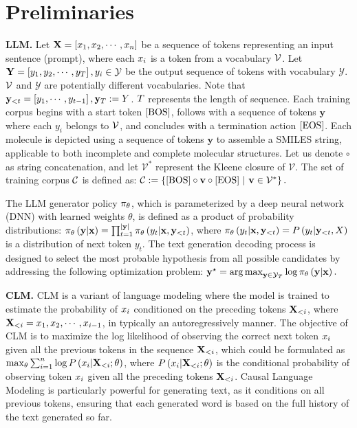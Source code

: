 \section{Preliminaries}
\textbf{LLM.} Let $\mathbf{X}=\left[{x}_1, {x}_2, \cdots, {x}_n\right]$ be a sequence of tokens representing an input sentence (prompt), where each ${x}_i$ is a token from a vocabulary $\mathcal{V}$. Let $\mathbf{Y}=\left[y_1,y_2,\cdots, y_T\right], y_i\in \mathcal{Y}$ be the output sequence of tokens with vocabulary $\mathcal{Y}$.  $\mathcal{V}$ and $\mathcal{Y}$ are potentially different vocabularies. Note that $\mathbf{y}_{<t} = \left[y_1, \cdots, y_{t-1}\right], \mathbf{y}_{T}:=Y$.
$T$ represents the length of sequence. 
Each training corpus begins with a start token $\left[\text{BOS}\right]$, follows with a sequence of tokens $\mathbf{y}$ where each $y_i$ belongs to $\mathcal{V}$, and concludes with a termination action $\left[\text{EOS}\right]$.
Each molecule is depicted using a sequence of tokens $\mathbf{y}$ to assemble a SMILES string, applicable to both incomplete and complete molecular structures.
Let us denote $\circ$ as string concatenation, and let $\mathcal{V}^*$ represent the Kleene closure of $\mathcal{V}$.
The set of training corpus $\mathcal{C}$ is defined as: 
    $\mathcal{C} := \left\{\text{[BOS]} \circ \mathbf{v} \circ \text{[EOS]}~|~\mathbf{v}\in \mathcal{V}^*\right\}.$

The LLM generator policy $\pi_{\theta}$, which is parameterized by a deep neural network (DNN) with learned weights $\theta$, is defined as a product of probability distributions:
$\pi_{\theta} \left( {\mathbf{y}|\mathbf{x}} \right) =\prod_{t=1}^{|\mathbf{y}|} \pi_{\theta} \left( {y_t|\mathbf{x},\mathbf{y}_{<t}} \right) $, where  $\pi_{\theta} \left( {y_t|\mathbf{x},\mathbf{y}_{<t}} \right) =P \left( {y_{t}|\mathbf{y}_{<t},X} \right) $ is a distribution of next token $y_t$.
The text generation decoding process is designed to select the most probable hypothesis from all possible candidates by addressing the following optimization problem:
$\mathbf{y}^{\star}=\mathop{\rm arg\,max}_{\mathbf{y}\in \mathcal{Y}_{T}} \log \pi_{\theta} \left( {\mathbf{y}|\mathbf{x}} \right) . $






\textbf{CLM.}
CLM is a variant of language modeling where the model is trained to estimate the probability of ${x}_i$ conditioned on the preceding tokens $\mathbf{\mathbf{X}}_{<i}$, where $\mathbf{\mathbf{X}}_{<i}= {x}_1,{x}_2,\cdots, {x}_{i-1}$, in typically an autoregressively manner.
The objective of CLM is to maximize the log likelihood of observing the correct next token ${x}_i$ given all the previous tokens in the sequence $\mathbf{X}_{<i}$, which could be formulated as 
$\max_{\theta}\sum^n_{i=1} \log P \left( {x_i|\mathbf{\mathbf{X}}_{<i};\theta} \right) $, where $P \left( {x_i|\mathbf{\mathbf{X}}_{<i};\theta} \right) $ is the conditional probability of observing token ${x}_i$ given all the preceding tokens $\mathbf{X}_{<i}$.
Causal Language Modeling is particularly powerful for generating text, as it conditions on all previous tokens, ensuring that each generated word is based on the full history of the text generated so far. 





